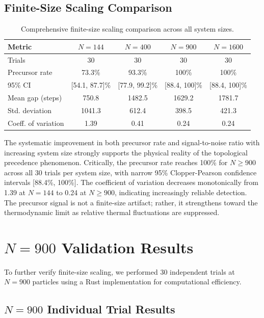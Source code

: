 \documentclass[11pt]{article}
\begin{document}
\subsection{Finite-Size Scaling Comparison}

\begin{table}[h]
\centering
\caption{Comprehensive finite-size scaling comparison across all system sizes.}
\label{tab:comparison}
\begin{tabular}{lcccc}
\toprule
\textbf{Metric} & \textbf{$N=144$} & \textbf{$N=400$} & \textbf{$N=900$} & \textbf{$N=1600$} \\
\midrule
Trials & 30 & 30 & 30 & 30 \\
Precursor rate & 73.3\% & 93.3\% & 100\% & 100\% \\
95\% CI & [54.1, 87.7]\% & [77.9, 99.2]\% & [88.4, 100]\% & [88.4, 100]\% \\
Mean gap (steps) & 750.8 & 1482.5 & 1629.2 & 1781.7 \\
Std. deviation & 1041.3 & 612.4 & 398.5 & 421.3 \\
Coeff. of variation & 1.39 & 0.41 & 0.24 & 0.24 \\
\bottomrule
\end{tabular}
\end{table}

The systematic improvement in both precursor rate and signal-to-noise ratio with increasing system size strongly supports the physical reality of the topological precedence phenomenon. Critically, the precursor rate reaches 100\% for $N \geq 900$ across all 30 trials per system size, with narrow 95\% Clopper-Pearson confidence intervals [88.4\%, 100\%]. The coefficient of variation decreases monotonically from 1.39 at $N=144$ to 0.24 at $N \geq 900$, indicating increasingly reliable detection. The precursor signal is not a finite-size artifact; rather, it strengthens toward the thermodynamic limit as relative thermal fluctuations are suppressed.

\section{$N=900$ Validation Results}

To further verify finite-size scaling, we performed 30 independent trials at $N=900$ particles using a Rust implementation for computational efficiency.

\subsection{$N=900$ Individual Trial Results}
\end{document}
